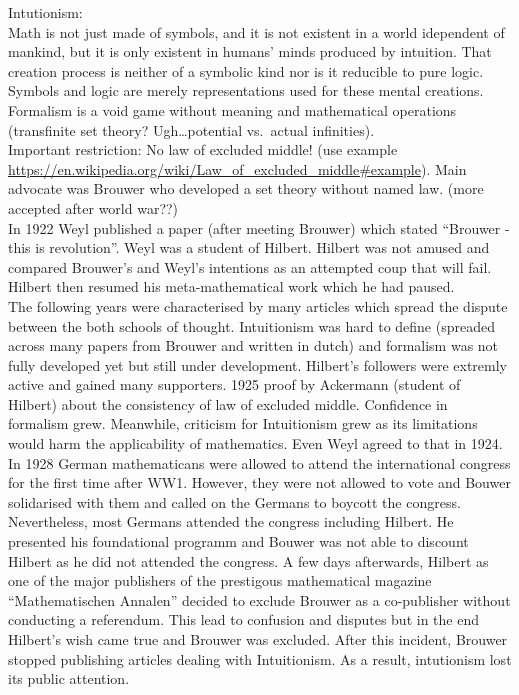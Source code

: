 \documentclass[hidelinks]{article}
\theoremstyle{plain}
\theoremstyle{definition}
\theoremstyle{rem}
\begin{document}
Intutionism:\\
Math is not just made of symbols, and it is not existent in a world idependent of mankind, but it is only existent in humans' minds produced by intuition. That creation process is neither of a symbolic kind nor is it reducible to pure logic. Symbols and logic are merely representations used for these mental creations. Formalism is a void game without meaning and mathematical operations (transfinite set theory? Ugh\ldots potential vs.\ actual infinities).\\
Important restriction: No law of excluded middle! (use example \url{https://en.wikipedia.org/wiki/Law\_of\_excluded\_middle#example}). Main advocate was Brouwer who developed a set theory without named law. (more accepted after world war??)\\

In 1922 Weyl published a paper (after meeting Brouwer) which stated ``Brouwer - this is revolution''. Weyl was a student of Hilbert. Hilbert was not amused and compared Brouwer's and Weyl's intentions as an attempted coup that will fail. Hilbert then resumed his meta-mathematical work which he had paused.\\

The following years were characterised by many articles which spread the dispute between the both schools of thought. Intuitionism was hard to define (spreaded across many papers from Brouwer and written in dutch) and formalism was not fully developed yet but still under development. Hilbert's followers were extremly active and gained many supporters. 1925 proof by Ackermann (student of Hilbert) about the consistency of law of excluded middle. Confidence in formalism grew. Meanwhile, criticism for Intuitionism grew as its limitations would harm the applicability of mathematics. Even Weyl agreed to that in 1924.\\

In 1928 German mathematicans were allowed to attend the international congress for the first time after WW1. However, they were not allowed to vote and Bouwer solidarised with them and called on the Germans to boycott the congress. Nevertheless, most Germans attended the congress including Hilbert. He presented his foundational programm and Bouwer was not able to discount Hilbert as he did not attended the congress. A few days afterwards, Hilbert as one of the major publishers of the prestigous mathematical magazine ``Mathematischen Annalen'' decided to exclude Brouwer as a co-publisher without conducting a referendum. This lead to confusion and disputes but in the end Hilbert's wish came true and Brouwer was excluded. After this incident, Brouwer stopped publishing articles dealing with Intuitionism. As a result, intutionism lost its public attention. \\
\end{document}
